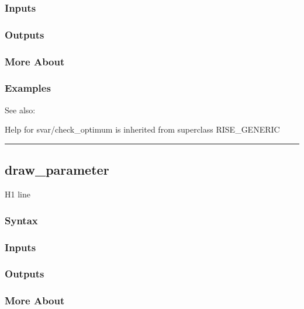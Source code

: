 \documentclass[letterpaper,10pt,english]{sphinxmanual}
\begin{document}
\subsubsection{Inputs}
\label{classes/models/@svar/svar:inputs}

\subsubsection{Outputs}
\label{classes/models/@svar/svar:outputs}

\subsubsection{More About}
\label{classes/models/@svar/svar:more-about}

\subsubsection{Examples}
\label{classes/models/@svar/svar:examples}
See also:

Help for svar/check\_optimum is inherited from superclass RISE\_GENERIC


\bigskip\hrule{}\bigskip



\subsection{draw\_parameter}
\label{classes/models/@svar/svar:id2}\label{classes/models/@svar/svar:draw-parameter}
H1 line


\subsubsection{Syntax}
\label{classes/models/@svar/svar:id3}

\subsubsection{Inputs}
\label{classes/models/@svar/svar:id4}

\subsubsection{Outputs}
\label{classes/models/@svar/svar:id5}

\subsubsection{More About}
\label{classes/models/@svar/svar:id6}
\end{document}
